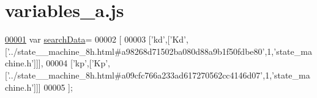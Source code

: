 \hypertarget{variables__a_8js_source}{}\section{variables\+\_\+a.\+js}
\label{variables__a_8js_source}

\begin{DoxyCode}
\hypertarget{variables__a_8js_source.tex_l00001}{}\hyperlink{variables__a_8js_ad01a7523f103d6242ef9b0451861231e}{00001} var \hyperlink{variables__a_8js_ad01a7523f103d6242ef9b0451861231e}{searchData}=
00002 [
00003   [\textcolor{stringliteral}{'kd'},[\textcolor{stringliteral}{'Kd'},[\textcolor{stringliteral}{'../state\_\_machine\_8h.html#a98268d71502ba080d88a9b1f50fdbe80'},1,\textcolor{stringliteral}{'state\_machine.h'}]]],
00004   [\textcolor{stringliteral}{'kp'},[\textcolor{stringliteral}{'Kp'},[\textcolor{stringliteral}{'../state\_\_machine\_8h.html#a09cfc766a233ad617270562cc4146d07'},1,\textcolor{stringliteral}{'state\_machine.h'}]]]
00005 ];
\end{DoxyCode}
